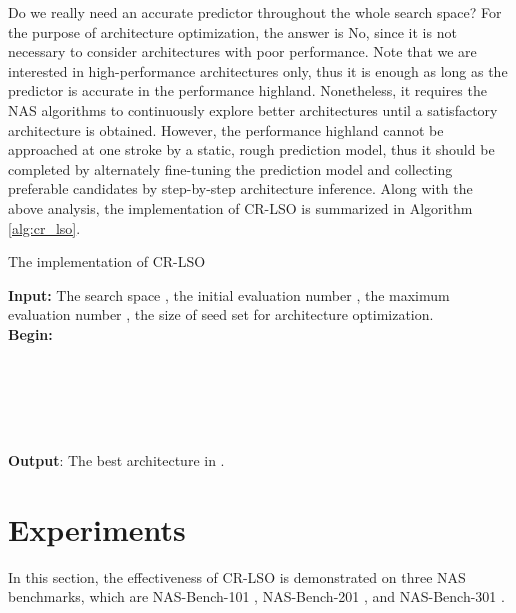 \documentclass[10pt,twocolumn,letterpaper]{article}
\begin{document}
Do we really need an accurate predictor throughout the whole search space? For the purpose of architecture optimization, the answer is No, since it is not necessary to consider architectures with poor performance. Note that we are interested in high-performance architectures only, thus it is enough as long as the predictor is accurate in the performance highland. Nonetheless, it requires the NAS algorithms to continuously explore better architectures until a satisfactory architecture is obtained. However, the performance highland cannot be approached at one stroke by a static, rough prediction model, thus it should be completed by alternately fine-tuning the prediction model and collecting preferable candidates by step-by-step architecture inference. Along with the above analysis, the implementation of CR-LSO is summarized in Algorithm \ref{alg:cr_lso}. 

\begin{algorithm}[htbp]
	\caption{The implementation of CR-LSO}
	{\textbf{Input:} The search space , the initial evaluation number , the maximum evaluation number }, the size  of seed set for architecture optimization. \\
	{\textbf{Begin:}}
	\begin{algorithmic}[1]
		  \\
		 \\
		\WHILE{}
		 \\
		 \\
		\ENDWHILE
	\end{algorithmic}
	\textbf{Output}: The best architecture  in . 
	\label{alg:cr_lso}
\end{algorithm}
\section{Experiments}
In this section, the effectiveness of CR-LSO is demonstrated on three NAS benchmarks, which are NAS-Bench-101 \cite{DBLP:conf/icml/YingKCR0H19}, NAS-Bench-201 \cite{DBLP:conf/iclr/Dong020}, and NAS-Bench-301 \cite{siems2020bench}. 
\end{document}
